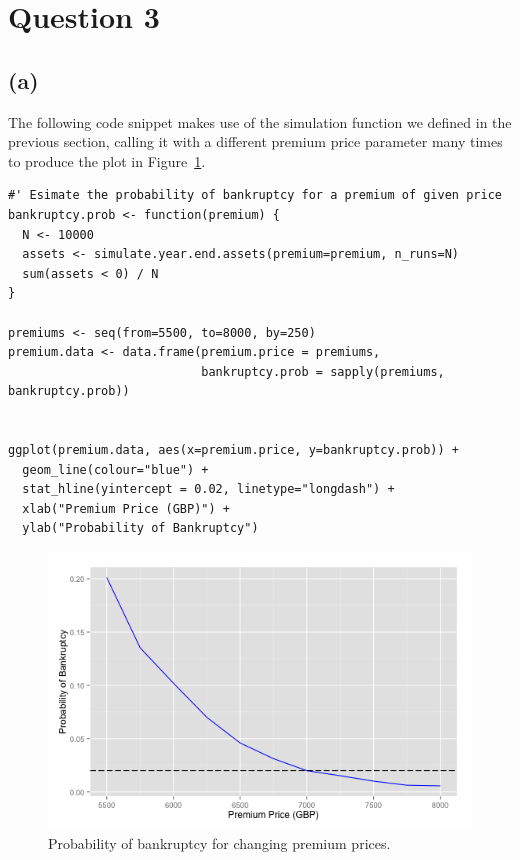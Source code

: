 \documentclass{article}
\begin{document}
\section*{Question 3}

\subsection*{(a)}

The following code snippet makes use of the simulation function we
defined in the previous section, calling it with a different premium
price parameter many times to produce the plot in Figure~\ref{fig:q3_premiums}.

\begin{verbatim}
#' Esimate the probability of bankruptcy for a premium of given price
bankruptcy.prob <- function(premium) {
  N <- 10000
  assets <- simulate.year.end.assets(premium=premium, n_runs=N)
  sum(assets < 0) / N
}

premiums <- seq(from=5500, to=8000, by=250)
premium.data <- data.frame(premium.price = premiums,
                           bankruptcy.prob = sapply(premiums, bankruptcy.prob))


ggplot(premium.data, aes(x=premium.price, y=bankruptcy.prob)) +
  geom_line(colour="blue") +
  stat_hline(yintercept = 0.02, linetype="longdash") +
  xlab("Premium Price (GBP)") +
  ylab("Probability of Bankruptcy")
\end{verbatim}

\begin{figure}
  \includegraphics[width=\textwidth]{q3_premiums}
  \caption{Probability of bankruptcy for changing premium prices.}
  \centering
\label{fig:q3_premiums}
\end{figure}
\end{document}

